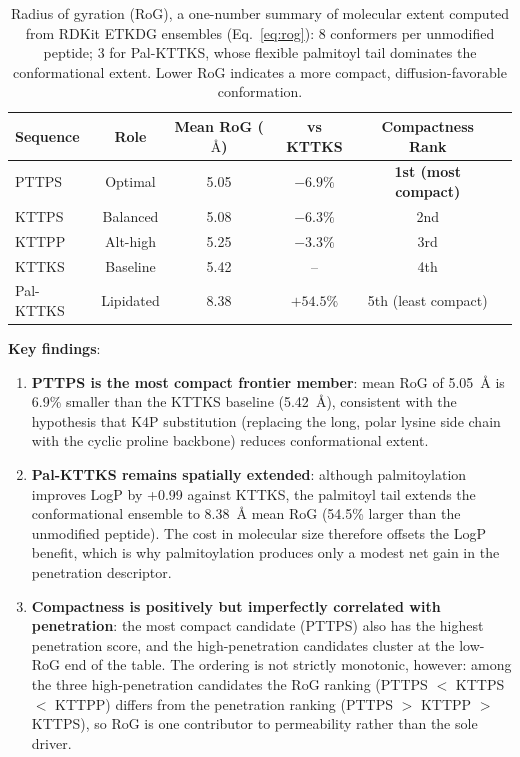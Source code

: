 \documentclass[11pt,letterpaper]{article}
\begin{document}
\begin{table}[H]
\centering
\small
\begin{tabular}{lccccc}
\toprule
\textbf{Sequence} & \textbf{Role} & \textbf{Mean RoG ($\text{\AA}$)} & \textbf{vs KTTKS} & \textbf{Compactness Rank} \\
\midrule
PTTPS & Optimal & 5.05 & $-6.9\%$ & \textbf{1st (most compact)} \\
KTTPS & Balanced & 5.08 & $-6.3\%$ & 2nd \\
KTTPP & Alt-high & 5.25 & $-3.3\%$ & 3rd \\
KTTKS & Baseline & 5.42 & -- & 4th \\
Pal-KTTKS & Lipidated & 8.38 & $+54.5\%$ & 5th (least compact) \\
\bottomrule
\end{tabular}
\caption{Radius of gyration (RoG), a one-number summary of molecular extent computed from RDKit ETKDG ensembles (Eq.~\ref{eq:rog}): 8 conformers per unmodified peptide; 3 for Pal-KTTKS, whose flexible palmitoyl tail dominates the conformational extent. Lower RoG indicates a more compact, diffusion-favorable conformation.}
\label{tab:rog}
\end{table}

\textbf{Key findings}:
\begin{enumerate}
  \item \textbf{PTTPS is the most compact frontier member}: mean RoG of 5.05~$\text{\AA}$ is 6.9\% smaller than the KTTKS baseline (5.42~$\text{\AA}$), consistent with the hypothesis that K4P substitution (replacing the long, polar lysine side chain with the cyclic proline backbone) reduces conformational extent.
  \item \textbf{Pal-KTTKS remains spatially extended}: although palmitoylation improves LogP by +0.99 against KTTKS, the palmitoyl tail extends the conformational ensemble to 8.38~$\text{\AA}$ mean RoG (54.5\% larger than the unmodified peptide). The cost in molecular size therefore offsets the LogP benefit, which is why palmitoylation produces only a modest net gain in the penetration descriptor.
  \item \textbf{Compactness is positively but imperfectly correlated with penetration}: the most compact candidate (PTTPS) also has the highest penetration score, and the high-penetration candidates cluster at the low-RoG end of the table. The ordering is not strictly monotonic, however: among the three high-penetration candidates the RoG ranking (PTTPS $<$ KTTPS $<$ KTTPP) differs from the penetration ranking (PTTPS $>$ KTTPP $>$ KTTPS), so RoG is one contributor to permeability rather than the sole driver.
\end{enumerate}
\end{document}
